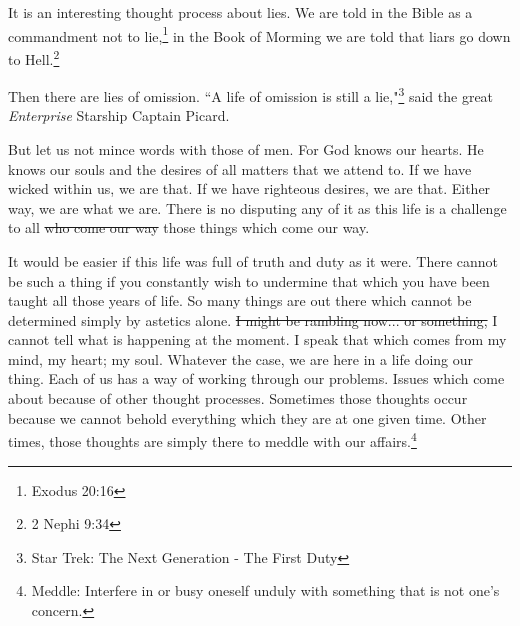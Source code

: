 It is an interesting thought process about lies. We are told in the Bible as a
commandment not to lie,\footnote{Exodus 20:16} in the Book of Morming we are 
told that liars go down to Hell.\footnote{2 Nephi 9:34}

Then there are lies of omission. ``A life of omission is still a 
lie,"\footnote{Star Trek: The Next Generation - The First Duty} said the great 
\textit{Enterprise} Starship Captain Picard.

But let us not mince words with those of men. For God knows our hearts. He knows
our souls and the desires of all matters that we attend to. If we have wicked
within us, we are that. If we have righteous desires, we are that. Either way,
we are what we are. There is no disputing any of it as this life is a challenge
to all \st{who come our way} those things which come our way.

It would be easier if this life was full of truth and duty as it were. There
cannot be such a thing if you constantly wish to undermine that which you have
been taught all those years of life. So many things are out there which cannot
be determined simply by astetics alone. \st{I might be rambling now... or 
something,} I cannot tell what is happening at the moment. I speak that which 
comes from my mind, my heart; my soul. Whatever the case, we are here in a life
doing our thing. Each of us has a way of working through our problems. Issues
which come about because of other thought processes. Sometimes those thoughts
occur because we cannot behold everything which they are at one given time.
Other times, those thoughts are simply there to meddle with our 
affairs.\footnote{Meddle: Interfere in or busy oneself unduly with something
that is not one's concern.}
